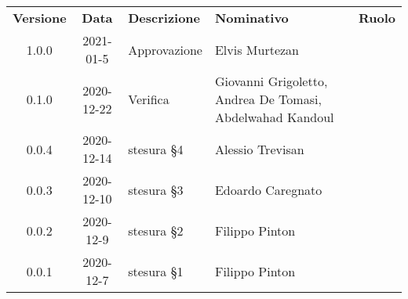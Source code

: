 {
\renewcommand{\arraystretch}{1.5}
\centering
\begin{longtable}{ c c  C{3.5cm}  C{4cm}  c }
    \rowcolor{\primaryColor}
    \textcolor{\secondaryColor}{
    \textbf{Versione}}     & \textcolor{\secondaryColor}{\textbf{Data}}       & \textcolor{\secondaryColor}
    {\textbf{Descrizione}} & \textcolor{\secondaryColor}{\textbf{Nominativo}} & \textcolor{\secondaryColor}{\textbf{Ruolo}}                                         \\


    1.0.0                  & 2021-01-5                                        & Approvazione               & Elvis Murtezan      & \responsabile{} \\

    0.1.0                  & 2020-12-22                                       & Verifica             & Giovanni Grigoletto, Andrea De Tomasi, Abdelwahad Kandoul  & \verificatore{} \\

    0.0.4               & 2020-12-14    & stesura §4 & Alessio Trevisan & \amministratore {} \\

    0.0.3               & 2020-12-10    & stesura §3 & Edoardo Caregnato & \amministratore {} \\

    0.0.2               & 2020-12-9    & stesura §2 & Filippo Pinton & \amministratore {} \\

    0.0.1               & 2020-12-7    & stesura §1 & Filippo Pinton & \amministratore {} \\



\end{longtable}
}